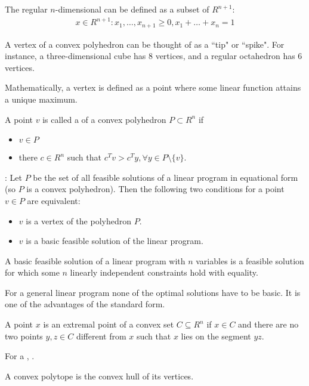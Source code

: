     \par The regular $n$-dimensional  can be defined as a subset of $R^{n + 1}$:
    \begin{align*}
      {x \in R^{n + 1}: x_1, \ldots, x_{n+1} \geq 0, x_1 + \ldots + x_n = 1}
    \end{align*}

    \par A vertex of a convex polyhedron can be thought of as a ``tip" or ``spike". For instance, a three-dimensional cube has 8 vertices, and a regular octahedron has 6 vertices.
    \par Mathematically, a vertex is defined as a point where some linear function attains a unique maximum. 
    \par A point $v$ is called a  of a convex polyhedron $P \subset R^n$ if
    \begin{itemize}
      \item $v \in P$
      \item there  $c \in R^n$ such that $c^T v > c^T y, \forall y \in P \setminus \{v\}$.
    \end{itemize}

    \par {}: Let $P$ be the set of all feasible solutions of a linear program in equational form (so $P$ is a convex polyhedron). Then the following two conditions for a point $v \in P$ are equivalent:
    \begin{itemize}
      \item $v$ is a vertex of the polyhedron $P$.
      \item $v$ is a basic feasible solution of the linear program.
    \end{itemize}

    \par A basic feasible solution of a linear program with $n$ variables is a feasible solution for which some $n$ linearly independent constraints hold with equality.

    \par For a general linear program none of the optimal solutions have to be basic. It is one of the advantages of the standard form.

    \par A point $x$ is an extremal point of a convex set $C \subseteq R^n$ if $x \in C$ and there are no two points $y, z \in C$ different from $x$ such that $x$ lies on the segment $yz$.
    \par For a , .
    \par A convex polytope is the convex hull of its vertices.